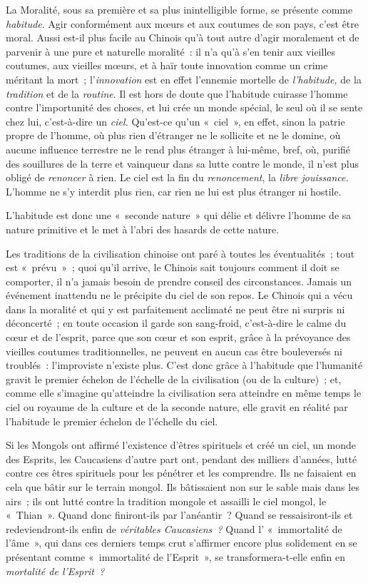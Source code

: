 \documentclass[french,twoside]{book} %
\begin{document}
La Moralité, sous sa première et sa plus inintelligible forme, se présente comme \emph{habitude}. Agir conformément aux mœurs et aux coutumes de son pays, c’est être moral. Aussi est-il plus facile au Chinois qu’à tout autre d’agir moralement et de parvenir à une pure et naturelle moralité : il n’a qu’à s’en tenir  aux vieilles coutumes, aux vieilles mœurs, et à haïr toute innovation comme un crime méritant la mort ; l’\emph{innovation} est en effet l’ennemie mortelle de \emph{l’habitude,} de la \emph{tradition} et de la \emph{routine}. Il est hors de doute que l’habitude cuirasse l’homme contre l’importunité des choses, et lui crée un monde spécial, le seul où il se sente chez lui, c’est-à-dire un \emph{ciel.} Qu’est-ce qu’un « ciel », en effet, sinon la patrie propre de l’homme, où plus rien d’étranger ne le sollicite et ne le domine, où aucune influence terrestre ne le rend plus étranger à lui-même, bref, où, purifié des souillures de la terre et vainqueur dans sa lutte contre le monde, il n’est plus obligé de \emph{renoncer} à rien. Le ciel est la fin du \emph{renoncement}, la \emph{libre jouissance.} L’homme ne s’y interdit plus rien, car rien ne lui est plus étranger ni hostile.\par
L’habitude est donc une « seconde nature » qui délie et délivre l’homme de sa nature primitive et le met à l’abri des hasards de cette nature.\par
Les traditions de la civilisation chinoise ont paré à toutes les éventualités ; tout est « prévu » ; quoi qu’il arrive, le Chinois sait toujours comment il doit se comporter, il n’a jamais besoin de prendre conseil des circonstances. Jamais un événement inattendu ne le précipite du ciel de son repos. Le Chinois qui a vécu dans la moralité et qui y est parfaitement acclimaté ne peut être ni surpris ni déconcerté ; en toute occasion il garde son sang-froid, c’est-à-dire le calme du cœur et de l’esprit, parce que son cœur et son esprit, grâce à la prévoyance des vieilles coutumes traditionnelles, ne peuvent en aucun cas être bouleversés ni troublés : l’improviste n’existe plus. C’est donc grâce à l’habitude que l’humanité gravit le premier échelon de l’échelle de la civilisation (ou de la culture) ; et, comme elle s’imagine qu’atteindre la civilisation sera atteindre en même temps le ciel ou royaume de la culture et de la seconde nature, elle gravit en réalité par l’habitude le premier échelon de l’échelle du ciel.\par
 Si les Mongols ont affirmé l’existence d’êtres spirituels et créé un ciel, un monde des Esprits, les Caucasiens d’autre part ont, pendant des milliers d’années, lutté contre ces êtres spirituels pour les pénétrer et les comprendre. Ils ne faisaient en cela que bâtir sur le terrain mongol. Ils bâtissaient non sur le sable mais dans les airs ; ils ont lutté contre la tradition mongole et assailli le ciel mongol, le « Thian ». Quand donc finiront-ils par l’anéantir ? Quand se ressaisiront-ils et redeviendront-ils enfin de \emph{véritables Caucasiens ?} Quand l’ « immortalité de l’âme », qui dans ces derniers temps crut s’affirmer encore plus solidement en se présentant comme « immortalité de l’Esprit », se transformera-t-elle enfin en \emph{mortalité de l’Esprit ?}\par
\end{document}
